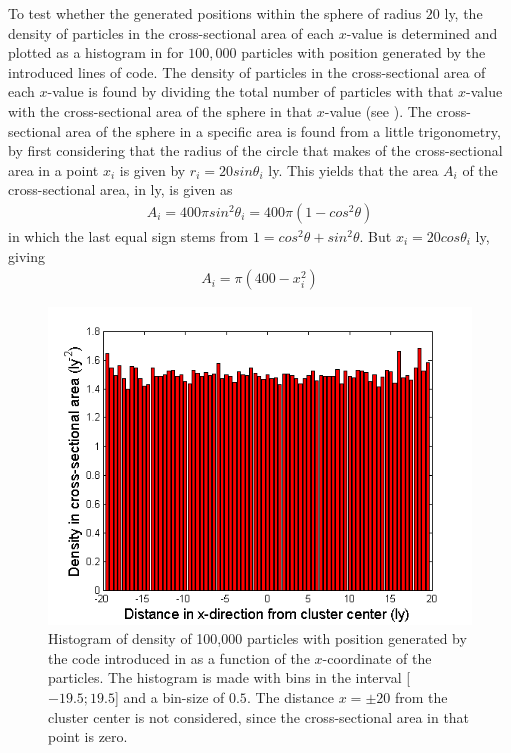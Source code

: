 To test whether the generated positions within the sphere of radius $20$ ly, the density of particles in the cross-sectional area of each $x$-value is determined and plotted as a histogram in  for $100,000$ particles with position generated by the introduced lines of code.  
The density of particles in the cross-sectional area of each $x$-value is found by dividing the total number of particles with that $x$-value with the cross-sectional area of the sphere in that $x$-value (see ).
The cross-sectional area of the sphere in a specific area is found from a little trigonometry, by first considering that the radius of the circle that makes of the cross-sectional area in a point $x_i$ is given by $r_i = 20sin\theta_i$ ly.  
This yields that the area $A_i$ of the cross-sectional area, in ly, is given as
\begin{align*}
	A_i = 400\pi sin^2 \theta_i =  400\pi (1 - cos^2 \theta)
\end{align*}
in which the last equal sign stems from $1 = cos^2 \theta + sin^2 \theta$.
But $x_i = 20 cos \theta_i$ ly, giving
\begin{align*}
	A_i = \pi (400 - x_i^2)
\end{align*}
\begin{figure}[H]
\centering
	\includegraphics[width=0.7\linewidth]{Figures/random_uniform_position_test.png}
\caption{
Histogram of density of 100,000 particles with position generated by the code introduced in  as a function of the $x$-coordinate of the particles. The histogram is made with bins in the interval [$-19.5;19.5$] and a bin-size of $0.5$. The distance $x = \pm 20$ from the cluster center is not considered, since the cross-sectional area in that point is zero.
}
\label{fig:UniformlyGeneratedPos}
\end{figure}